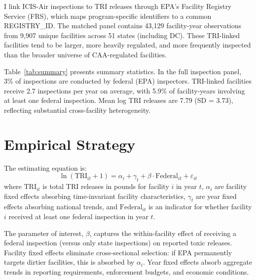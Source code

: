 \documentclass[12pt]{article}
\begin{document}
I link ICIS-Air inspections to TRI releases through EPA's Facility Registry Service (FRS), which maps program-specific identifiers to a common REGISTRY\_ID. The matched panel contains 43,129 facility-year observations from 9,907 unique facilities across 51 states (including DC). These TRI-linked facilities tend to be larger, more heavily regulated, and more frequently inspected than the broader universe of CAA-regulated facilities.



Table~\ref{tab:summary} presents summary statistics. In the full inspection panel, 3\% of inspections are conducted by federal (EPA) inspectors. TRI-linked facilities receive 2.7 inspections per year on average, with 5.9\% of facility-years involving at least one federal inspection. Mean log TRI releases are 7.79 (SD = 3.73), reflecting substantial cross-facility heterogeneity.


\section{Empirical Strategy}

The estimating equation is:
\begin{equation}
\ln(\text{TRI}_{it} + 1) = \alpha_i + \gamma_t + \beta \cdot \text{Federal}_{it} + \varepsilon_{it}
\label{eq:main}
\end{equation}
where $\text{TRI}_{it}$ is total TRI releases in pounds for facility $i$ in year $t$, $\alpha_i$ are facility fixed effects absorbing time-invariant facility characteristics, $\gamma_t$ are year fixed effects absorbing national trends, and $\text{Federal}_{it}$ is an indicator for whether facility $i$ received at least one federal inspection in year $t$.

The parameter of interest, $\beta$, captures the within-facility effect of receiving a federal inspection (versus only state inspections) on reported toxic releases. Facility fixed effects eliminate cross-sectional selection: if EPA permanently targets dirtier facilities, this is absorbed by $\alpha_i$. Year fixed effects absorb aggregate trends in reporting requirements, enforcement budgets, and economic conditions.
\end{document}
